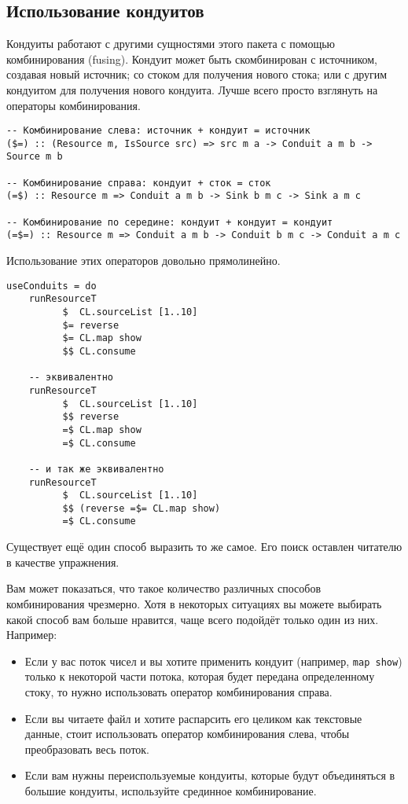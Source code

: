\subsection{Использование кондуитов}
Кондуиты работают с другими сущностями этого пакета с помощью комбинирования (fusing).
Кондуит может быть скомбинирован с источником, создавая новый источник; 
со стоком для получения нового стока; или с другим кондуитом для получения 
нового кондуита. Лучше всего просто взглянуть на операторы комбинирования. 
\begin{lstlisting}
-- Комбинирование слева: источник + кондуит = источник
($=) :: (Resource m, IsSource src) => src m a -> Conduit a m b -> Source m b

-- Комбинирование справа: кондуит + сток = сток
(=$) :: Resource m => Conduit a m b -> Sink b m c -> Sink a m c

-- Комбинирование по середине: кондуит + кондуит = кондуит
(=$=) :: Resource m => Conduit a m b -> Conduit b m c -> Conduit a m c
\end{lstlisting}
Использование этих операторов довольно прямолинейно.
\begin{lstlisting}
useConduits = do
    runResourceT
          $  CL.sourceList [1..10]
          $= reverse
          $= CL.map show
          $$ CL.consume

    -- эквивалентно
    runResourceT
          $  CL.sourceList [1..10]
          $$ reverse
          =$ CL.map show
          =$ CL.consume

    -- и так же эквивалентно
    runResourceT
          $  CL.sourceList [1..10]
          $$ (reverse =$= CL.map show)
          =$ CL.consume
\end{lstlisting}
Существует ещё один способ выразить то же самое. Его поиск оставлен читателю
 в качестве упражнения.

Вам может показаться, что такое количество различных способов комбинирования 
чрезмерно. Хотя в некоторых ситуациях вы можете выбирать какой способ вам больше нравится,
чаще всего подойдёт только один из них. Например:

\begin{itemize}   
\item Если у вас поток чисел и вы хотите применить кондуит (например, 
\lstinline'map show') только к некоторой части потока, которая будет передана 
определенному стоку, то нужно использовать оператор комбинирования справа.
\item Если вы читаете файл и хотите распарсить его целиком как текстовые данные, 
стоит использовать оператор комбинирования слева, чтобы преобразовать весь поток.
\item Если вам нужны переиспользуемые кондуиты, которые будут объединяться в 
большие кондуиты, используйте срединное комбинирование.
\end{itemize}

